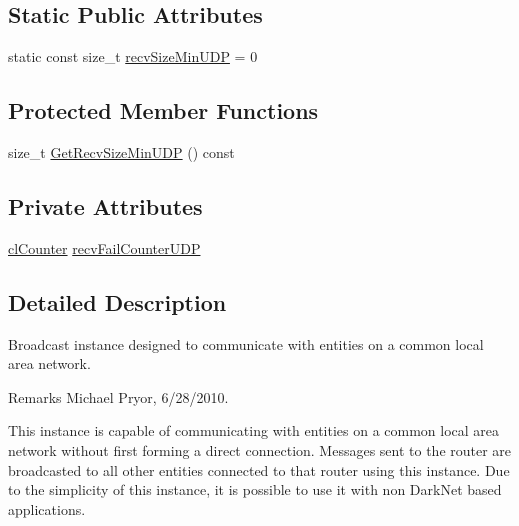 \subsection*{Static Public Attributes}
\begin{DoxyCompactItemize}
\item 
static const size\_\-t \hyperlink{classcl_broadcast_state_a68d5adfa849a922c8ae63ec25e884b37}{recvSizeMinUDP} = 0
\end{DoxyCompactItemize}
\subsection*{Protected Member Functions}
\begin{DoxyCompactItemize}
\item 
size\_\-t \hyperlink{classcl_broadcast_state_a70bfa8a41680d5d12babc9d35bd21097}{GetRecvSizeMinUDP} () const 
\end{DoxyCompactItemize}
\subsection*{Private Attributes}
\begin{DoxyCompactItemize}
\item 
\hyperlink{classcl_counter}{clCounter} \hyperlink{classcl_broadcast_state_ae1a39353704b20addef1fc686557bc80}{recvFailCounterUDP}
\end{DoxyCompactItemize}


\subsection{Detailed Description}
Broadcast instance designed to communicate with entities on a common local area network. \begin{DoxyRemark}{Remarks}
Michael Pryor, 6/28/2010.
\end{DoxyRemark}
This instance is capable of communicating with entities on a common local area network without first forming a direct connection. Messages sent to the router are broadcasted to all other entities connected to that router using this instance. Due to the simplicity of this instance, it is possible to use it with non DarkNet based applications. 

